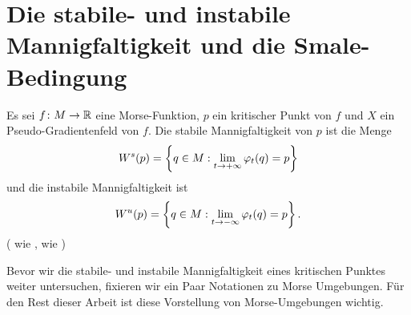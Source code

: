 \section{Die stabile- und instabile Mannigfaltigkeit und die Smale-Bedingung}

\begin{definition}
    \label{def: stabile und instabile mannigfaltigkeit}
    Es sei $f \colon M \to { \mathbb R }$ eine Morse-Funktion, $p$ ein kritischer Punkt von $f$ und $X$ ein
    Pseudo-Gradientenfeld von $f$. Die stabile Mannigfaltigkeit von $p$ ist die Menge
    \[ { W^s } (p) = \left\{ q \in M : \lim_{t \to + \infty} \varphi_t(q) = p \right\} \]
    und die instabile Mannigfaltigkeit ist
    \[ { W^u } (p) = \left\{ q \in M : \lim_{t \to - \infty} \varphi_t(q) = p \right\} . \]
    ( wie ,  wie )
\end{definition}

Bevor wir die stabile- und instabile Mannigfaltigkeit eines kritischen Punktes weiter untersuchen, 
fixieren wir ein Paar Notationen zu Morse Umgebungen. Für den Rest dieser Arbeit ist diese 
Vorstellung von Morse-Umgebungen wichtig.

